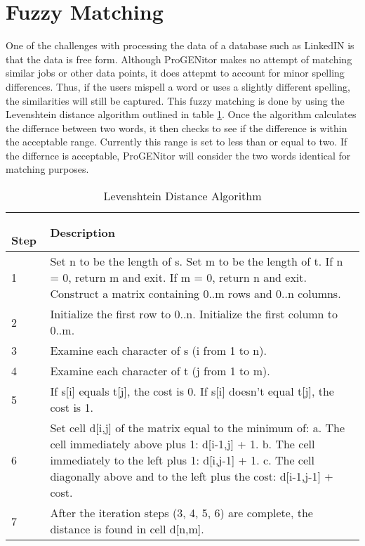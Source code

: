 \section{Fuzzy Matching}
\label{sect:fuzzy-matching}
One of the challenges with processing the data of a database such as LinkedIN is
that the data is free form.  Although ProGENitor makes no attempt of matching
similar jobs or other data points, it does attepmt to account for minor spelling
differences.  Thus, if the users mispell a word or uses a slightly different
spelling, the similarities will still be captured. This fuzzy matching is
done by using the Levenshtein distance algorithm\cite{fuzzy} outlined in table
\ref{tab:lev-dist}.  Once the algorithm calculates the differnce between two
words, it then checks to see if the difference is within the acceptable range. 
Currently this range is set to less than or equal to two.  If the differnce is
acceptable, ProGENitor will consider the two words identical for matching
purposes.


\begin{table}[H]
  \caption{Levenshtein Distance Algorithm}
  \centering
  \begin{tabular}{|p{.5in}|p{4in}|}
  \hline
  \
  Step & Description \\
  \hline\hline
  1 &  Set n to be the length of s.\newline 
  Set m to be the length of t.\newline
  If n = 0, return m and exit.\newline
  If m = 0, return n and exit.\newline
  Construct a matrix containing 0..m rows and 0..n columns.  \\ \hline 
  2 &  	Initialize the first row to 0..n.\newline
  Initialize the first column to 0..m.\\ \hline 
  3 & Examine each character of s (i from 1 to n). \\ \hline
  4 & Examine each character of t (j from 1 to m). \\ \hline
  5 &  	If s[i] equals t[j], the cost is 0.\newline
  If s[i] doesn't equal t[j], the cost is 1. \\\hline 
  6 &  	Set cell d[i,j] of the matrix equal to the minimum of:\newline
  a. The cell immediately above plus 1: d[i-1,j] + 1.\newline
  b. The cell immediately to the left plus 1: d[i,j-1] + 1.\newline
  c. The cell diagonally above and to the left plus the cost: d[i-1,j-1] + cost.\\ \hline
  7 & After the iteration steps (3, 4, 5, 6) are complete, the distance is found in cell d[n,m]. \\ \hline
  \end{tabular}
  \label{tab:lev-dist}
\end{table}

